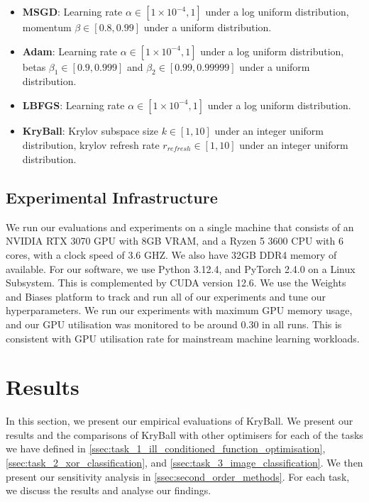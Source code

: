 \begin{itemize}
    \item \textbf{MSGD}: Learning rate $\alpha \in [1 \times 10^{-4}, 1]$ under a log uniform distribution, momentum $\beta \in [0.8, 0.99]$ under a uniform distribution.
    \item \textbf{Adam}: Learning rate $\alpha \in [1 \times 10^{-4}, 1]$ under a log uniform distribution, betas $\beta_1 \in [0.9, 0.999]$ and $\beta_2 \in [0.99, 0.99999]$ under a uniform distribution.
    \item \textbf{LBFGS}: Learning rate $\alpha \in [1 \times 10^{-4}, 1]$ under a log uniform distribution.
    \item \textbf{KryBall}: Krylov subspace size $k \in [1, 10]$ under an integer uniform distribution, krylov refresh rate $r_{\mathit{refresh}} \in [1, 10]$ under an integer uniform distribution.
\end{itemize}

\subsection{Experimental Infrastructure}
\label{ssec:experimental_infrastructure}
We run our evaluations and experiments on a single machine that consists of an NVIDIA RTX 3070 GPU with 8GB VRAM, and a Ryzen 5 3600 CPU with 6 cores, with a clock speed of 3.6 GHZ. We also have 32GB DDR4 memory of available. For our software, we use Python 3.12.4, and PyTorch 2.4.0 on a Linux Subsystem. This is complemented by CUDA version 12.6. We use the Weights and Biases platform to track and run all of our experiments and tune our hyperparameters. We run our experiments with maximum GPU memory usage, and our GPU utilisation was monitored to be around 0.30 in all runs. This is consistent with GPU utilisation rate for mainstream machine learning workloads.    

\section{Results}
\label{sec:results}
In this section, we present our empirical evaluations of KryBall. We present our results and the comparisons of KryBall with other optimisers for each of the tasks we have defined in \cref{ssec:task_1_ill_conditioned_function_optimisation}, \cref{ssec:task_2_xor_classification}, and \cref{ssec:task_3_image_classification}. We then present our sensitivity analysis in \cref{ssec:second_order_methods}. For each task, we discuss the results and analyse our findings. 

